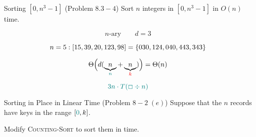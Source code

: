 
\begin{frame}{}
  \begin{exampleblock}{Sorting $[0, n^3-1]$ (Problem $8.3-4$)}
    Sort $n$ integers in $[0, n^3-1]$ in $O(n)$ time.
  \end{exampleblock}

  \pause
  \[
    n\text{-ary} \qquad d = 3
  \]

  \pause
  \[
    n = 5: [15, 39, 20, 123, 98] = \left\{030, 124, 040, 443, 343\right\}
  \]

  \pause
  \[
    \Theta\Big(d (\underbrace{n}_{\textcolor{teal}{n}} + \underbrace{n}_{\textcolor{red}{k}})\Big) = \Theta(n)
  \]

  \pause
  \vspace{0.30cm}
  \centerline{}

  \pause
  \vspace{0.30cm}
  \[
    \textcolor{teal}{3n \cdot T(\Box \div n)}
  \]
\end{frame}

\begin{frame}{}
  \begin{exampleblock}{Sorting in Place in Linear Time (Problem $8-2\; (e)$)}
    Suppose that the $n$ records have keys in the range $[\textcolor{teal}{0}, k]$.

    Modify \textsc{Counting-Sort} to sort them  {} in  time.
  \end{exampleblock}

  \begin{columns}
      \pause
      \pause

      \pause
  \end{columns}
\end{frame}

\begin{frame}{}
  \centerline{}

  \pause
  \vspace{0.50cm}
  \centerline{\large {}}
\end{frame}

% 
